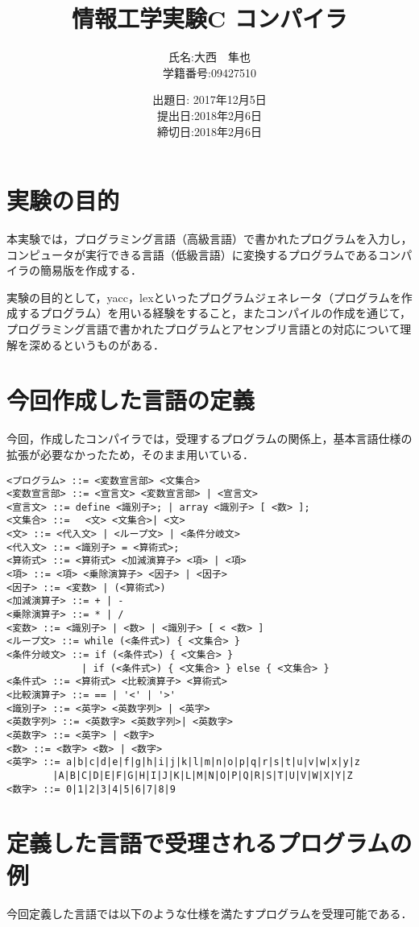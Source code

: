 \documentclass[a4j]{jarticle}
\title{情報工学実験C コンパイラ}
\author{氏名:大西　隼也 \\学籍番号:09427510}
\date{出題日: 2017年12月5日\\提出日:2018年2月6日 \\締切日:2018年2月6日}
\begin{document}
\maketitle


\section{実験の目的}
本実験では，プログラミング言語（高級言語）で書かれたプログラムを入力し，コンピュータが実行できる言語（低級言語）に変換するプログラムであるコンパイラの簡易版を作成する．

実験の目的として，yacc，lexといったプログラムジェネレータ（プログラムを作成するプログラム）を用いる経験をすること，またコンパイルの作成を通じて，プログラミング言語で書かれたプログラムとアセンブリ言語との対応について理解を深めるというものがある．

\section{今回作成した言語の定義}

今回，作成したコンパイラでは，受理するプログラムの関係上，基本言語仕様の拡張が必要なかったため，そのまま用いている．

\begin{verbatim}
<プログラム> ::= <変数宣言部> <文集合>
<変数宣言部> ::= <宣言文> <変数宣言部> | <宣言文>
<宣言文> ::= define <識別子>; | array <識別子> [ <数> ];
<文集合> ::= 　<文> <文集合>| <文>
<文> ::= <代入文> | <ループ文> | <条件分岐文>
<代入文> ::= <識別子> = <算術式>;
<算術式> ::= <算術式> <加減演算子> <項> | <項>
<項> ::= <項> <乗除演算子> <因子> | <因子>
<因子> ::= <変数> | (<算術式>)
<加減演算子> ::= + | -
<乗除演算子> ::= * | /
<変数> ::= <識別子> | <数> | <識別子> [ < <数> ]
<ループ文> ::= while (<条件式>) { <文集合> }
<条件分岐文> ::= if (<条件式>) { <文集合> } 
			 | if (<条件式>) { <文集合> } else { <文集合> } 
<条件式> ::= <算術式> <比較演算子> <算術式>
<比較演算子> ::= == | '<' | '>'
<識別子> ::= <英字> <英数字列> | <英字>
<英数字列> ::= <英数字> <英数字列>| <英数字>
<英数字> ::= <英字> | <数字>
<数> ::= <数字> <数> | <数字>
<英字> ::= a|b|c|d|e|f|g|h|i|j|k|l|m|n|o|p|q|r|s|t|u|v|w|x|y|z
		|A|B|C|D|E|F|G|H|I|J|K|L|M|N|O|P|Q|R|S|T|U|V|W|X|Y|Z
<数字> ::= 0|1|2|3|4|5|6|7|8|9
\end{verbatim}


\section{定義した言語で受理されるプログラムの例}
今回定義した言語では以下のような仕様を満たすプログラムを受理可能である．
\end{document}
